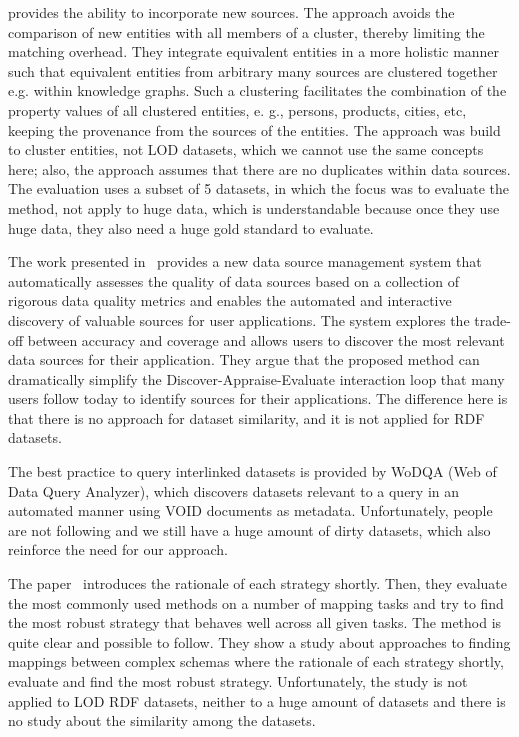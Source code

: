 \documentclass[sw]{iosart2x}
\begin{document}
\cite{nentwig2018incremental} provides the ability to incorporate new sources.
The approach avoids the comparison of new entities with all members of a cluster, thereby limiting the matching overhead.
They integrate equivalent entities in a more holistic manner such that equivalent entities from arbitrary many sources are clustered together e.g. within knowledge graphs.
Such a clustering facilitates the combination of the property values of all clustered entities, e. g., persons, products, cities, etc, keeping the provenance from the sources of the entities. The approach was build to cluster entities, not LOD datasets, which we cannot use the same concepts here; also, the approach assumes that there are no duplicates within data sources.
The evaluation uses a subset of 5 datasets, in which the focus was to evaluate the method, not apply to huge data, which is understandable because once they use huge data, they also need a huge gold standard to evaluate.

The work presented in~\cite{rekatsinas2015finding} provides a new data source management system that automatically assesses the quality of data sources based on a collection of rigorous data quality metrics and enables the automated and interactive discovery of valuable sources for user applications.
The system explores the trade-off between accuracy and coverage and allows users to discover the most relevant data sources for their application.
They argue that the proposed method can dramatically simplify the Discover-Appraise-Evaluate interaction loop that many users follow today to identify sources for their applications.
The difference here is that there is no approach for dataset similarity, and it is not applied for RDF datasets.

The best practice to query interlinked datasets is provided by WoDQA (Web of Data Query Analyzer)\cite{akar2012querying}, which discovers datasets relevant to a query in an automated manner using VOID documents as metadata.
Unfortunately, people are not following and we still have a huge amount of dirty datasets, which also reinforce the need for our approach.

The paper~\cite{peukert2010comparing} introduces the rationale of each strategy shortly.
Then, they evaluate the most commonly used methods on a number of mapping tasks and try to find the most robust strategy that behaves well across all given tasks.
The method is quite clear and possible to follow.
They show a study about approaches to finding mappings between complex schemas where the rationale of each strategy shortly, evaluate and find the most robust strategy.
Unfortunately, the study is not applied to LOD RDF datasets, neither to a huge amount of datasets and there is no study about the similarity among the datasets.
\end{document}
